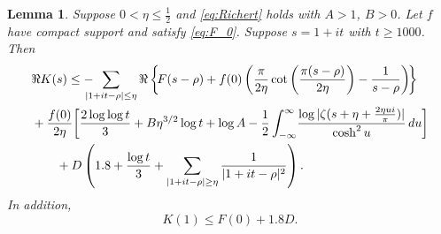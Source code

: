 \documentclass[10pt]{amsart}
\theoremstyle{remark}
\theoremstyle{plain}
\newtheorem{lemma}{Lemma}[section]
\numberwithin{equation}{section}
\theoremstyle{definition}
\def\({\left(}
\def\){\right)}
\def\pfrac#1#2{\left(\frac{#1}{#2}\right)}
\def\nts{\negthickspace}
\begin{document}
%
%

\begin{lemma}\label{lem:K(s) II}
Suppose $0<\eta \le \frac12$ and \eqref{eq:Richert} holds with $A>1$, $B>0$.
Let $f$ have compact support
and satisfy \eqref{eq:F_0}.  Suppose $s=1+it$ with $t\ge 1000$.
Then
\begin{align*}
&\Re K(s) \le  - \nts\nts\nts\sum_{|1+it-\rho| \le \eta} \Re \left\{\!
   F(s-\rho) + f(0) \( \frac{\pi}{2\eta} \cot\pfrac{\pi(s-\rho)}{2\eta}
   -\frac{1}{s-\rho} \)\! \right\}\\
&+ \frac{f(0)}{2\eta} \biggl[\frac{2 \log\log t}3 + B \eta^{3/2} \log t+\log A
  - \frac12 \int_{-\infty}^\infty\! \frac{\log|\zeta(s+\eta+\tfrac{2\eta ui}
  {\pi})|}{\cosh^2 u}\, du \biggr] \\
&\qquad +D \( 1.8 + \frac{\log t}{3} + \sum_{|1+it-\rho| \ge \eta} \frac{1}
  {|1+it-\rho|^2} \).
\end{align*}
In addition,
$$
K(1) \le F(0) + 1.8 D.
$$
\end{lemma}
\end{document}
